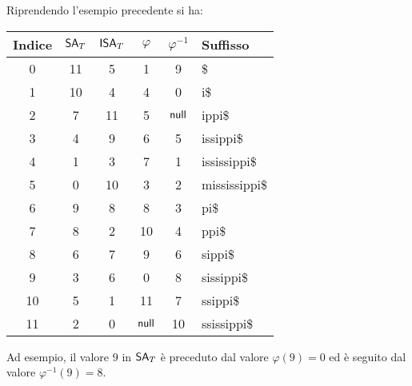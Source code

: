 \begin{esempio}
   Riprendendo l'esempio precedente si ha:
   \begin{table}[H]
     \centering
     \footnotesize
     \begin{tabular}{c|c|c|c|c|l} 
       \textbf{Indice} & $\mbox{\rm {\sf SA}}_T$ & $\mbox{\rm {\sf ISA}}_T$
       & $\varphi$
       & $\varphi^{-1}$ & \textbf{Suffisso}\\  
       \hline
       0 & 11 & 5 & 1 & 9 & \$\\
       1 & 10 & 4 & 4 & 0 & i\$\\
       2 & 7 & 11 & 5 & $\mbox{\rm {\sf null}}$ & ippi\$\\
       3 & 4 & 9 & 6 & 5 & issippi\$\\
       4 & 1 & 3 & 7 & 1 & ississippi\$\\
       5 & 0 & 10 & 3 & 2 & mississippi\$\\
       6 & 9 & 8 & 8 & 3 & pi\$\\
       7 & 8 & 2 & 10 & 4 & ppi\$\\
       8 & 6 & 7 & 9 & 6 & sippi\$\\
       9 & 3 & 6 & 0 & 8 & sissippi\$\\
       10 & 5 & 1 & 11 & 7 & ssippi\$\\
       11 & 2 & 0 & $\mbox{\rm {\sf null}}$ & 10 & ssissippi\$\\
     \end{tabular}
   \end{table}
   Ad esempio, il valore $9$ in $\mbox{\rm {\sf SA}}_T$ è preceduto dal valore
  $\varphi(9)=0$ ed è seguito dal valore $\varphi^{-1}(9)=8$.
\end{esempio}
